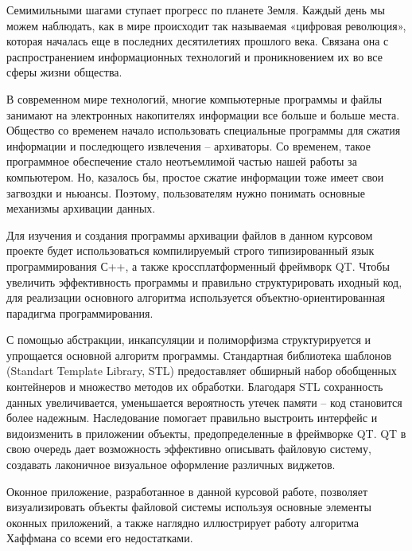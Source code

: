 \label{sec:intro}

Семимильными шагами ступает прогресс по планете Земля. Каждый день мы можем наблюдать,
как в мире происходит так называемая «цифровая революция», которая
началась еще в последних десятилетиях прошлого века. Связана она с распространением
информационных технологий и проникновением их во все сферы жизни общества.



В современном мире технологий, многие компьютерные программы и файлы занимают на электронных накопителях информации все больше и больше места. 
Общество со временем начало использовать специальные программы для сжатия информации и последющего извлечения -- архиваторы. 
Со временем, такое программное обеспечение стало неотъемлимой частью нашей работы за компьютером. 
Но, казалось бы, простое сжатие информации тоже имеет свои загвоздки и ньюансы.
Поэтому, пользователям нужно понимать основные механизмы архивации данных.



Для изучения и создания программы архивации файлов в данном курсовом проекте будет использоваться компилируемый строго типизированный язык программирования С++, а также кроссплатформенный фреймворк QT.
Чтобы увеличить эффективность программы и правильно структурировать иходный код, для реализации основного алгоритма используется объектно-ориентированная парадигма программирования.



С помощью абстракции, инкапсуляции и полиморфизма\cite{lafore} структурируется и упрощается основной алгоритм программы. 
Стандартная библиотека шаблонов\cite{lucik} (Standart Template Library, STL) предоставляет обширный набор обобщенных контейнеров и множество методов их обработки. 
Благодаря STL сохранность данных увеличивается, уменьшается вероятность утечек памяти -- код становится более надежным.
Наследование помогает правильно выстроить интерфейс и видоизменить в приложении объекты, предопределенные в фреймворке QT\cite{qt_doc}. 
QT в свою очередь дает возможность эффективно описывать файловую систему, создавать лаконичное визуальное оформление различных виджетов.



Оконное приложение, разработанное в данной курсовой работе, позволяет визуализировать объекты файловой системы используя основные элементы оконных приложений, а также наглядно иллюстрирует работу алгоритма Хаффмана со всеми его недостатками. 